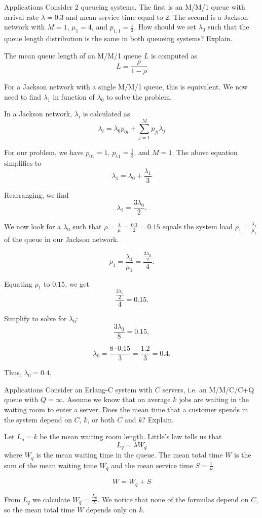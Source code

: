 \begin{problem}{Applications}
Consider 2 queueing systems. The first is an M/M/1 queue with arrival rate \( \lambda = 0.3 \) and mean service time equal to 2. The second is a Jackson network with \( M = 1 \), \( \mu_1 = 4 \), and \( p_{1,1} = \frac{1}{3} \). How should we set \( \lambda_0 \) such that the queue length distribution is the same in both queueing systems? Explain.
\end{problem}
\begin{solution}
The mean queue length of an M/M/1 queue \( L \) is computed as
\[
L = \frac{\rho}{1-\rho}
\]

For a Jackson network with a single M/M/1 queue, this is equivalent. We now need to find \( \lambda_1 \) in function of \( \lambda_0 \) to solve the problem.

In a Jackson network, \( \lambda_i \) is calculated as
\[
\lambda_i = \lambda_0 p_{0i} + \sum_{j=1}^M p_{ji} \lambda_j
\]

For our problem, we have \( p_{01} = 1 \), \( p_{11} = \frac{1}{3} \), and \( M = 1 \). The above equation simplifies to
\[
\lambda_1 = \lambda_0 + \frac{\lambda_1}{3}
\]

Rearranging, we find
\[
\lambda_1 = \frac{3\lambda_0}{2}.
\]

We now look for a \( \lambda_0 \) such that \( \rho = \frac{\lambda}{\mu} = \frac{0.3}{2} = 0.15 \) equals the system load \( \rho_1 = \frac{\lambda_1}{\mu_1} \) of the queue in our Jackson network.

\[
\rho_1 = \frac{\lambda_1}{\mu_1} = \frac{\frac{3\lambda_0}{2}}{4}.
\]

Equating \( \rho_1 \) to \( 0.15 \), we get
\[
\frac{\frac{3\lambda_0}{2}}{4} = 0.15.
\]

Simplify to solve for \( \lambda_0 \):
\[
\frac{3\lambda_0}{8} = 0.15,
\]

\[
\lambda_0 = \frac{8 \cdot 0.15}{3} = \frac{1.2}{3} = 0.4.
\]

Thus, \( \lambda_0 = 0.4 \).\end{solution}

\begin{problem}{Applications}
Consider an Erlang-C system with \( C \) servers, i.e. an M/M/C/C+Q queue with \( Q = \infty \). Assume we know that on average \( k \) jobs are waiting in the waiting room to enter a server. Does the mean time that a customer spends in the system depend on \( C \), \( k \), or both \( C \) and \( k \)? Explain.
\end{problem}
\begin{solution}
    Let $L_q=k$ be the mean waiting room length. Little's law tells us that
    \[
        L_q=\lambda W_q
    \]
    where $W_q$ is the mean waiting time in the queue. The mean total time $W$ is the sum of the mean waiting time $W_q$ and the mean service time $S=\frac{1}{\mu}$.

    \[
        W = W_q + S
    \]

    From $L_q$ we calculate $W_q=\frac{L_q}{\lambda}$. We notice that none of the formulas depend on $C$, so the mean total time $W$ depends only on $k$.
\end{solution}
